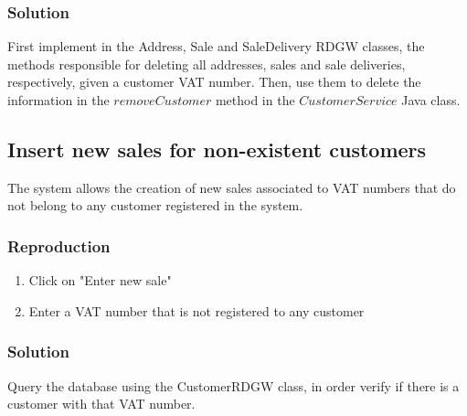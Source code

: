 \documentclass[12pt]{article}
\begin{document}
\subsubsection{Solution}
First implement in the Address, Sale and SaleDelivery RDGW classes, the methods responsible for deleting all addresses, sales and sale deliveries, respectively, given a customer VAT number. Then, use them to delete the information in the $removeCustomer$ method in the $CustomerService$ Java class.

\subsection{Insert new sales for non-existent customers}
The system allows the creation of new sales associated to VAT numbers that do not belong to any customer registered in the system.

\subsubsection{Reproduction}
\begin{enumerate}
   \item  Click on "Enter new sale"
   
   \item  Enter a VAT number that is not registered to any customer
\end{enumerate}


\subsubsection{Solution}
Query the database using the CustomerRDGW class, in order verify if there is a customer with that VAT number.







\end{document}
